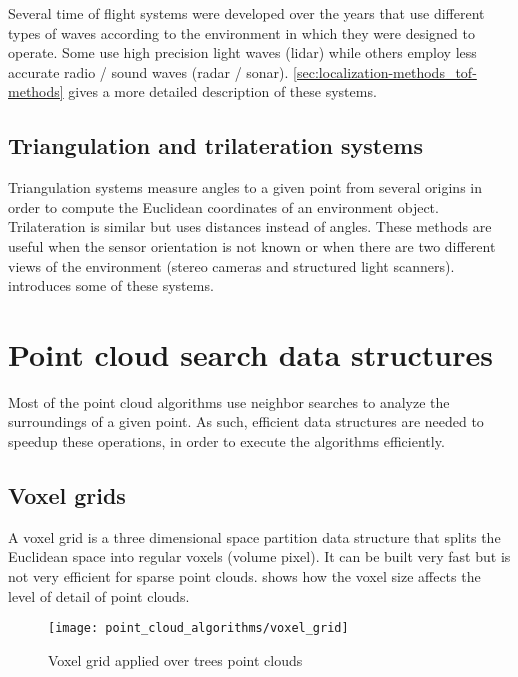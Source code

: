 Several time of flight systems were developed over the years that use different types of waves according to the environment in which they were designed to operate. Some use high precision light waves (\gls{lidar}) while others employ less accurate radio / sound waves (\gls{radar} / \gls{sonar}). \cref{sec:localization-methods_tof-methods} gives a more detailed description of these systems.


\subsection{Triangulation and trilateration systems}

Triangulation systems measure angles to a given point from several origins in order to compute the Euclidean coordinates of an environment object. Trilateration is similar but uses distances instead of angles. These methods are useful when the sensor orientation is not known or when there are two different views of the environment (stereo cameras and structured light scanners).  introduces some of these systems.



\section{Point cloud search data structures}

Most of the point cloud algorithms use neighbor searches to analyze the surroundings of a given point. As such, efficient data structures are needed to speedup these operations, in order to execute the algorithms efficiently.


\subsection{Voxel grids}

A voxel grid is a three dimensional space partition data structure that splits the Euclidean space into regular voxels (volume pixel). It can be built very fast but is not very efficient for sparse point clouds.  shows how the voxel size affects the level of detail of point clouds.

\begin{figure}[H]
	\centering
	\texttt{[image: point\_cloud\_algorithms/voxel\_grid]}
	\caption{Voxel grid applied over trees point clouds \cite{Wu2013}}
	\label{fig:point-cloud-algorithms_voxel-grid}
\end{figure}



